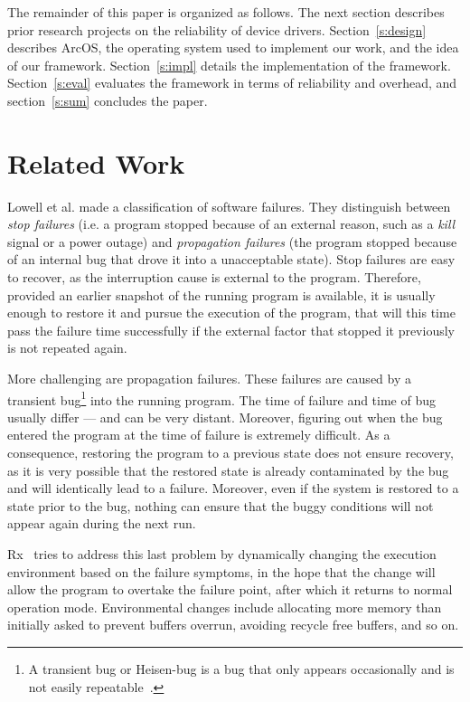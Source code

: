 \documentclass[times, 10pt, twocolumn]{article}
\begin{document}
The remainder of this paper is organized as follows.  The next section describes prior research projects on the reliability of device drivers.  Section~\ref{s:design} describes ArcOS, the operating system used to implement our work, and the idea of our framework.  Section~\ref{s:impl} details the implementation of the framework.  Section~\ref{s:eval} evaluates the framework in terms of reliability and overhead, and section~\ref{s:sum} concludes the paper.


\section{Related Work}
\label{s:rel}

Lowell et al. \cite{Lowell2000} made a classification of software failures. They distinguish between \emph{stop failures} (i.e. a program stopped because of an external reason, such as a \emph{kill} signal or a power outage) and \emph{propagation failures} (the program stopped because of an internal bug that drove it into a unacceptable state). Stop failures are easy to recover, as the interruption cause is external to the program. Therefore, provided an earlier snapshot of the running program is available, it is usually enough to restore it and pursue the execution of the program, that will this time pass the failure time successfully if the external factor that stopped it previously is not repeated again.

More challenging are propagation failures. These failures are caused by a transient bug\footnote{A transient bug or Heisen-bug is a bug that only appears occasionally and is not easily repeatable~\cite{Gray1985}.} into the running program. The time of failure and time of bug usually differ --- and can be very distant. Moreover, figuring out when the bug entered the program at the time of failure is extremely difficult. As a consequence, restoring the program to a previous state does not ensure recovery, as it is very possible that the restored state is already contaminated by the bug and will identically lead to a failure. Moreover, even if the system is restored to a state prior to the bug, nothing can ensure that the buggy conditions will not appear again during the next run.

Rx~\cite{Qin2007} tries to address this last problem by dynamically changing the execution environment based on the failure symptoms, in the hope that the change will allow the program to overtake the failure point, after which it returns to normal operation mode. Environmental changes include allocating more memory than initially asked to prevent buffers overrun, avoiding  recycle free buffers, and so on.
\end{document}
